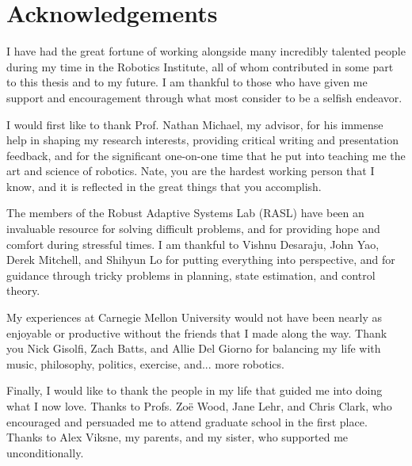 \section*{Acknowledgements}

I have had the great fortune of working alongside many incredibly talented people
during my time in the Robotics Institute, all of whom contributed in some part to
this thesis and to my future. I am thankful to those who have given me support
and encouragement through what most consider to be a selfish endeavor.

I would first like to thank Prof. Nathan Michael, my advisor, for his immense
help in shaping my research interests, providing critical writing and
presentation feedback, and for the significant one-on-one time that he put into teaching me
the art and science of robotics. Nate, you are the hardest working person that I know,
and it is reflected in the great things that you accomplish.

The members of the Robust Adaptive Systems Lab (RASL) have been an invaluable
resource for solving difficult problems, and for providing hope and comfort
during stressful times. I am thankful to Vishnu Desaraju, John Yao,
Derek Mitchell, and Shihyun Lo for putting everything into perspective, and for
guidance through tricky problems in planning, state estimation, and control
theory.

My experiences at Carnegie Mellon University would not have been nearly as
enjoyable or productive without the friends that I made along the way. Thank you
Nick Gisolfi, Zach Batts, and Allie Del Giorno for balancing my life with music,
philosophy, politics, exercise, and... more robotics.

Finally, I would like to thank the people in my life that guided me into doing
what I now love. Thanks to Profs. Zo\"{e} Wood, Jane Lehr, and Chris Clark, who
encouraged and persuaded me to attend graduate school in the first place.
Thanks to Alex Viksne, my parents, and my sister, who supported me unconditionally.
